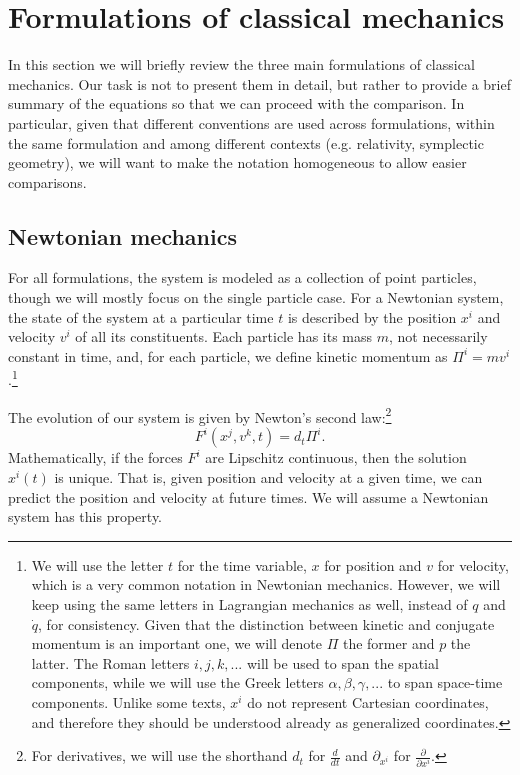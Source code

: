 \section{Formulations of classical mechanics}

In this section we will briefly review the three main formulations of classical mechanics. Our task is not to present them in detail, but rather to provide a brief summary of the equations so that we can proceed with the comparison. In particular, given that different conventions are used across formulations, within the same formulation and among different contexts (e.g. relativity, symplectic geometry), we will want to make the notation homogeneous to allow easier comparisons.

\subsection{Newtonian mechanics}

For all formulations, the system is modeled as a collection of point particles, though we will mostly focus on the single particle case. For a Newtonian system, the state of the system at a particular time $t$ is described by the position $x^i$ and velocity $v^i$ of all its constituents. Each particle has its mass $m$, not necessarily constant in time, and, for each particle, we define kinetic momentum as $\Pi^i = m v^i$.\footnote{We will use the letter $t$ for the time variable, $x$ for position and $v$ for velocity, which is a very common notation in Newtonian mechanics. However, we will keep using the same letters in Lagrangian mechanics as well, instead of $q$ and $\dot{q}$, for consistency. Given that the distinction between kinetic and conjugate momentum is an important one, we will denote $\Pi$ the former and $p$ the latter. The Roman letters $i,j,k,...$ will be used to span the spatial components, while we will use the Greek letters $\alpha, \beta, \gamma, ...$ to span space-time components. Unlike some texts, $x^i$ do not represent Cartesian coordinates, and therefore they should be understood already as generalized coordinates.}

The evolution of our system is given by Newton's second law:\footnote{For derivatives, we will use the shorthand $d_t$ for $\frac{d}{dt}$ and $\partial_{x^i}$ for $\frac{\partial}{\partial x^i}$. }
\begin{equation}\label{rp-cm-NewtonsSecondLaw}
	F^i(x^j, v^k, t) = d_t \Pi^i.
\end{equation}
Mathematically, if the forces $F^i$ are Lipschitz continuous, then the solution $x^i(t)$ is unique. That is, given position and velocity at a given time, we can predict the position and velocity at future times. We will assume a Newtonian system has this property.

